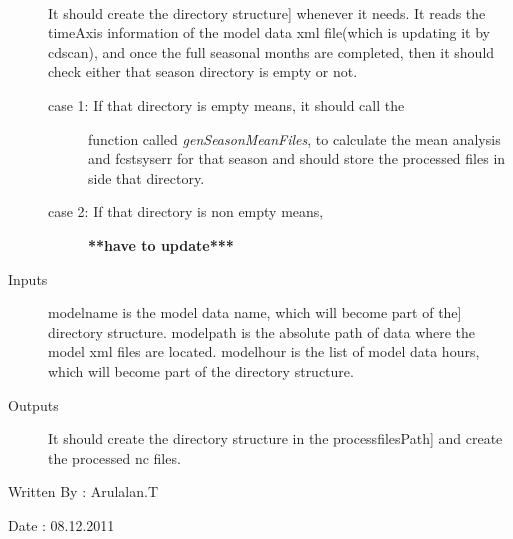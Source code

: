 \documentclass[letterpaper,10pt,english]{sphinxmanual}
\begin{document}
\begin{fulllineitems}
\label{diagnosis:compute_season_mean.genMeanAnlFcstErrDirs}~\begin{description}
\item[{}] \leavevmode{[}It should create the directory structure{]}
whenever it needs. It reads the timeAxis information of the
model data xml file(which is updating it by cdscan), and once
the full seasonal months are completed, then it should check
either that season directory is empty or not.
\begin{description}
\item[{case 1: If that directory is empty means, it should call the}] \leavevmode
function called \emph{genSeasonMeanFiles}, to calculate
the mean analysis and fcstsyserr for that season and should
store the processed files in side that directory.

\item[{case 2: If that directory is non empty means,}] \leavevmode
\textbf{**have to update***}

\end{description}

\item[{Inputs}] \leavevmode{[}modelname is the model data name, which will become part of the{]}
directory structure.
modelpath is the absolute path of data where the model xml files
are located.
modelhour is the list of model data hours, which will become
part of the directory structure.

\item[{Outputs}] \leavevmode{[}It should create the directory structure in the processfilesPath{]}
and create the processed nc files.

\end{description}

Written By : Arulalan.T

Date : 08.12.2011

\end{fulllineitems}

\end{document}
